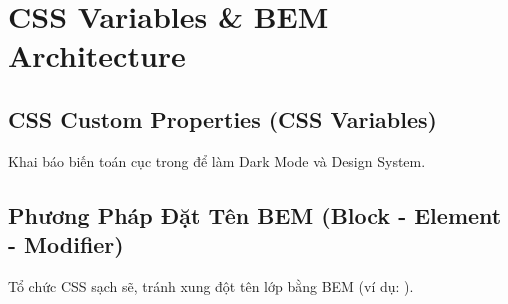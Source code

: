\chapter{CSS Variables \& BEM Architecture}
\label{chap:css_variables_bem}

\section{CSS Custom Properties (CSS Variables)}
Khai báo biến toán cục trong  để làm Dark Mode và Design System.

\section{Phương Pháp Đặt Tên BEM (Block - Element - Modifier)}
Tổ chức CSS sạch sẽ, tránh xung đột tên lớp bằng BEM (ví dụ: ).
